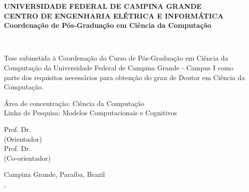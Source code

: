 \begin{center}
\textbf{UNIVERSIDADE FEDERAL DE CAMPINA GRANDE} \\
\textbf{CENTRO DE ENGENHARIA ELÉTRICA E INFORMÁTICA} \\
\textbf{Coordenação de Pós-Graduação em Ciência da Computação}
\vspace{3em}

\Large{}
\thetitle
\vspace{3em}

\Large{\theauthor}\\
\vspace{3em}

\normalsize
\begin{flushright}
\parbox[t]{122mm}{Tese submetida à Coordenação do Curso de Pós-Graduação em Ciência da Computação da Universidade Federal de Campina Grande - Campus I como parte dos requisitos necessários para obtenção do grau de Doutor em Ciência da Computação.}
\end{flushright}
\vspace{3em}

\begin{flushleft}
Área de concentração: Ciência da Computação\\
Linha de Pesquisa: Modelos Computacionais e Cognitivos
\vspace{3em}
\end{flushleft}

Prof. Dr. \profa\\
(Orientador) \\
\vspace{1em}
Prof. Dr. \profb\\
(Co-orientador)
\vfill

Campina Grande, Paraíba, Brazil \\
\MONTH, \the\year
\end{center}